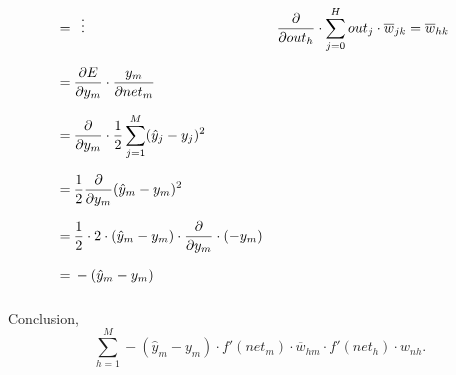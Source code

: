 \documentclass[12pt]{article}
\begin{document}
\begin{equation}
\begin{aligned}
        \:=\: & \mathrel{\makebox[\widthof{=}]{\vdots}}                                                              & \frac{\partial}{\partial out_{h}} \cdot \sum_{j=0}^{H} out_{j} \cdot \overline{w}_{jk} = \overline{w}_{hk}                                                                              \\[0.68em]
                                          \:=\: & \frac{\partial E}{\partial y_{m}} \cdot \frac{y_{m} }{\partial net_{m} }                             &                                                              &                                                                  \\[0.68em]
                                          \:=\: & \frac{\partial}{\partial y_{m}} \cdot \frac{1}{2} \sum_{j=1}^{M} (\hat{y}_{j} - y_{j})^{2}             &                                                              &                                                                  \\[0.68em]
                                          \:=\: & \frac{1}{2} \frac{\partial}{\partial y_{m}} (\hat{y}_{m} - y_{m})^{2}             &                                                              &                                                                  \\[0.68em]
                                          \:=\: & \frac{1}{2} \cdot 2 \cdot (\hat{y}_{m} - y_{m}) \cdot  \frac{\partial}{\partial y_{m}} \cdot (-y_{m} )            &                                                              &                                                                  \\[0.68em]
                                          \:=\: & -(\hat{y}_{m} - y_{m})            &                                                              &                                                                  \\[0.68em]
    \end{aligned}
\end{equation}

Conclusion, $$ \sum_{h=1}^{M} - (\hat{y}_{m} - y_{m}) \cdot f'(net_{m}) \cdot \overline{w}_{hm} \cdot f'(net_{h}) \cdot w_{nh}. $$
\end{document}
